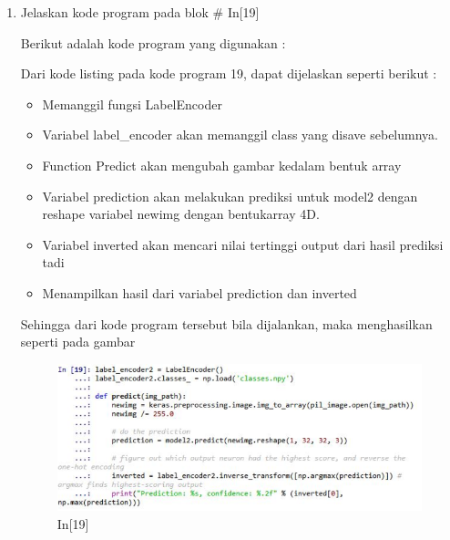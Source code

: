 \begin{enumerate}
\item Jelaskan kode program pada blok \# In[19]
\par Berikut adalah kode program yang digunakan :

\par Dari kode listing pada kode program 19, dapat dijelaskan seperti berikut :
\begin{itemize}
\item Memanggil fungsi LabelEncoder
\item Variabel label\_encoder akan memanggil class yang disave sebelumnya.
\item Function Predict akan mengubah gambar kedalam bentuk array
\item Variabel prediction akan melakukan prediksi untuk model2 dengan reshape variabel newimg dengan bentukarray 4D.
\item Variabel inverted akan mencari nilai tertinggi output dari hasil prediksi tadi
\item Menampilkan hasil dari variabel prediction dan inverted
\end{itemize}
\par Sehingga dari kode program tersebut bila dijalankan, maka menghasilkan seperti pada gambar 
\begin{figure}[!htbp]
	\centerline{\includegraphics[width=1\textwidth]{figures/andi/p19.PNG}}
	\caption{In[19]}
\end{figure}


\end{enumerate}

